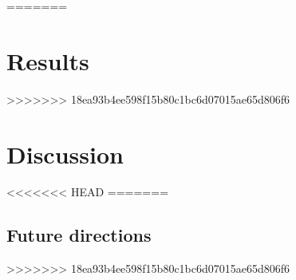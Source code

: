 \documentclass[12pt]{article}
\begin{document}
%
%
%
%
%
%
=======
\section{Results}
>>>>>>> 18ea93b4ee598f15b80c1bc6d07015ae65d806f6


\section{Discussion}

<<<<<<< HEAD
=======
\subsection{Future directions}

>>>>>>> 18ea93b4ee598f15b80c1bc6d07015ae65d806f6

\newpage


\end{document}
